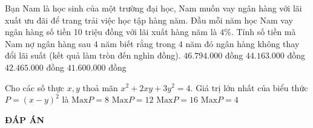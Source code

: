 \begin{ex}%
	Bạn Nam là học sinh của một trường đại học, Nam muốn vay ngân hàng với lãi xuất ưu đãi để trang trải việc học tập hàng năm. Đầu mỗi năm học Nam vay ngân hàng số tiền 10 triệu đồng với lãi xuất hàng năm là $4\%$. Tính số tiền mà Nam nợ ngân hàng sau $4$ năm biết rằng trong $4$ năm đó ngân hàng không thay đổi lãi suất (kết quả làm tròn đến nghìn đồng).
	\choice
	{$46.794.000$ đồng}
	{\True $44.163.000$ đồng}
	{$42.465.000$ đồng}
	{$41.600.000$ đồng}
\end{ex}


\begin{ex}%
	Cho các số thực $x, y$ thoả mãn $x^2+2xy+3y^2=4$. Giá trị lớn nhất của biểu thức $P=(x-y)^2$ là
	\choice
	{$\mathrm{Max}P=8$}
	{\True $\mathrm{Max}P=12$}
	{$\mathrm{Max}P=16$}
	{$\mathrm{Max}P=4$}
\end{ex}




\newpage
\begin{center}
	\textbf{ĐÁP ÁN}
\end{center}
\begin{multicols}{10}
	 
\end{multicols}
